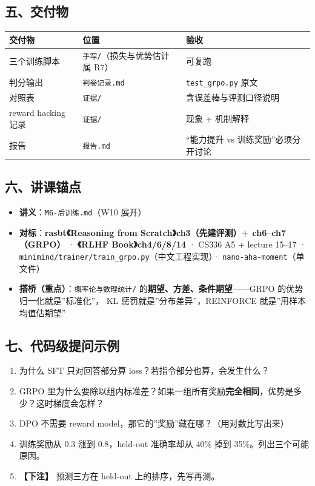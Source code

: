 \documentclass[
  chinese,
  11pt,
]{ctexart}
\newcounter{none} %
\providecommand{\tightlist}{%
  \setlength{\itemsep}{0pt}\setlength{\parskip}{0pt}}
\begin{document}
\subsection{五、交付物}\label{ux4e94ux4ea4ux4ed8ux7269-6}

{\def\LTcaptype{none} %
\begin{longtable}[]{@{}lll@{}}
\toprule\noalign{}
交付物 & 位置 & 验收 \\
\midrule\noalign{}
\endhead
\bottomrule\noalign{}
\endlastfoot
三个训练脚本 & \texttt{手写/}（损失与优势估计属 R7） & 可复跑 \\
判分输出 & \texttt{判卷记录.md} & \texttt{test\_grpo.py} 原文 \\
对照表 & \texttt{证据/} & 含误差棒与评测口径说明 \\
reward hacking 记录 & \texttt{证据/} & 现象 + 机制解释 \\
报告 & \texttt{报告.md} & ``能力提升 vs 训练奖励''必须分开讨论 \\
\end{longtable}
}

\subsection{六、讲课锚点}\label{ux516dux8bb2ux8bfeux951aux70b9-5}

\begin{itemize}
\tightlist
\item
  \textbf{讲义}：\texttt{M6-后训练.md}（W10 展开）
\item
  \textbf{对标}：\textbf{rasbt《Reasoning from Scratch》ch3（先建评测）+ ch6--ch7（GRPO）} · \textbf{《RLHF Book》ch4/6/8/14} · CS336 A5 + lecture 15--17 · \texttt{minimind/trainer/train\_grpo.py}（中文工程实现）· \texttt{nano-aha-moment}（单文件）
\item
  \textbf{搭桥（重点）}：\texttt{概率论与数理统计/} 的\textbf{期望、方差、条件期望}------GRPO 的优势归一化就是''标准化''， KL 惩罚就是''分布差异''，REINFORCE 就是''用样本均值估期望''
\end{itemize}

\subsection{七、代码级提问示例}\label{ux4e03ux4ee3ux7801ux7ea7ux63d0ux95eeux793aux4f8b-5}

\begin{enumerate}
\def\labelenumi{\arabic{enumi}.}
\tightlist
\item
  为什么 SFT 只对回答部分算 loss？若指令部分也算，会发生什么？
\item
  GRPO 里为什么要除以组内标准差？如果一组所有奖励\textbf{完全相同}，优势是多少？这时梯度会怎样？
\item
  DPO 不需要 reward model，那它的''奖励''藏在哪？（用对数比写出来）
\item
  训练奖励从 0.3 涨到 0.8，held-out 准确率却从 40\% 掉到 35\%。列出三个可能原因。
\item
  \textbf{【下注】} 预测三方在 held-out 上的排序，先写再测。
\end{enumerate}
\end{document}
